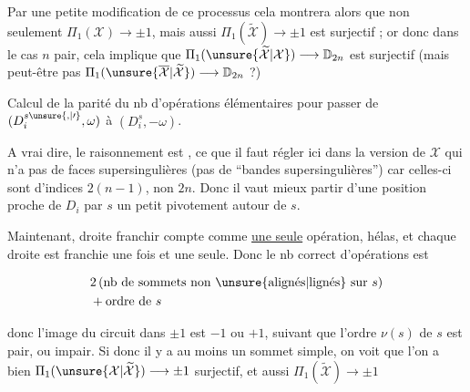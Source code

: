 
Par une petite modification de ce processus cela montrera alors que non seulement $\Pi_1(\mathcal X)\longrightarrow\pm1$, mais aussi $\Pi_1(\widetilde{\mathcal X})\longrightarrow\pm1$ est surjectif ; or donc dans le cas $n$ pair, cela implique que $\Pi_1(\unsure{\widetilde{\mathcal X}|\mathcal X})\longrightarrow\mathbb D_{2n}$ est surjectif (mais peut-être pas $\Pi_1(\unsure{\overline{\mathcal X}|\widetilde{\mathcal X}})\longrightarrow\mathbb D_{2n}$ ?)

Calcul de la parité du nb d'opérations élémentaires pour passer de $(D_i^{s\unsure{,|\prime}},\omega)$ à $(D_i^{s},-\omega)$.





A vrai dire, le raisonnement est ,  ce que il faut régler ici dans la version de $\mathcal X$ qui n'a pas de faces supersingulières (pas de ``bandes supersingulières'') car celles-ci sont d'indices $2(n-1)$, non $2n$. Donc il vaut mieux partir d'une position proche de $D_i$  par $s$  un petit pivotement autour de $s$.

Maintenant,  droite  franchir compte comme \uline{une seule} opération, hélas, et chaque droite   est franchie une fois et une seule. Donc le nb correct d'opérations est

\[ \begin{aligned}
&2\,(\text{nb de sommets non \unsure{alignés|lignés} sur }s)\\
&+\text{ordre de }s
\end{aligned} \]

donc l'image du circuit dans $\pm1$ est $-1$ ou $+1$, suivant que l'ordre  $\nu(s)$ de $s$ est pair, ou impair. Si donc il y a au moins un sommet simple, on voit que l'on a bien $\Pi_1(\unsure{\mathcal X|\widetilde{\mathcal X}})\longrightarrow\pm1$ surjectif, et aussi $\Pi_1(\widetilde{\mathcal X})\longrightarrow\pm1$ 
